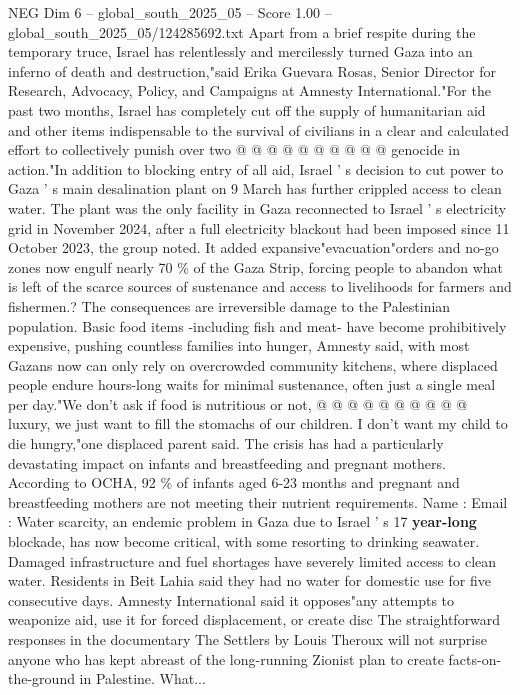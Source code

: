 \begin{textsample}{NEG Dim 6 – global\_south\_2025\_05 – Score 1.00 – global\_south\_2025\_05/124285692.txt}
Apart from a brief respite during the temporary truce, Israel has relentlessly and mercilessly turned Gaza into an inferno of death and destruction,"said Erika Guevara Rosas, Senior Director for Research, Advocacy, Policy, and Campaigns at Amnesty International."For the past two months, Israel has completely cut off the supply of humanitarian aid and other items indispensable to the survival of civilians in a clear and calculated effort to collectively punish over two @ @ @ @ @ @ @ @ @ @ genocide in action."In addition to blocking entry of all aid, Israel ' s decision to cut power to Gaza ' s main desalination plant on 9 March has further crippled access to clean water.
The plant was the only facility in Gaza reconnected to Israel ' s electricity grid in November 2024, after a full electricity blackout had been imposed since 11 October 2023, the group noted.
It added expansive"evacuation"orders and no-go zones now engulf nearly 70 \% of the Gaza Strip, forcing people to abandon what is left of the scarce sources of sustenance and access to livelihoods for farmers and fishermen.?
The consequences are irreversible damage to the Palestinian population.
Basic food items -including fish and meat- have become prohibitively expensive, pushing countless families into hunger, Amnesty said, with most Gazans now can only rely on overcrowded community kitchens, where displaced people endure hours-long waits for minimal sustenance, often just a single meal per day."We don't ask if food is nutritious or not, @ @ @ @ @ @ @ @ @ @ luxury, we just want to fill the stomachs of our children.
I don't want my child to die hungry,"one displaced parent said.
The crisis has had a particularly devastating impact on infants and breastfeeding and pregnant mothers.
According to OCHA, 92 \% of infants aged 6-23 months and pregnant and breastfeeding mothers are not meeting their nutrient requirements.
Name : Email : Water scarcity, an endemic problem in Gaza due to Israel ' s 17 \textbf{year-long} blockade, has now become critical, with some resorting to drinking seawater.
Damaged infrastructure and fuel shortages have severely limited access to clean water.
Residents in Beit Lahia said they had no water for domestic use for five consecutive days.
Amnesty International said it opposes"any attempts to weaponize aid, use it for forced displacement, or create disc The straightforward responses in the documentary The Settlers by Louis Theroux will not surprise anyone who has kept abreast of the long-running Zionist plan to create facts-on-the-ground in Palestine.
What...

\end{textsample}
